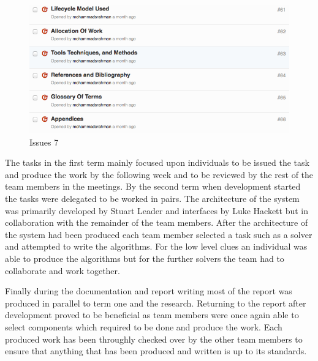 \begin{figure}[H]
  \centering
  \includegraphics[width=\linewidth]{images/issues7.png}
  \caption{Issues 7}
  \label{fig:issues7}
\end{figure}

The tasks in the first term mainly focused upon individuals to be issued the task and produce the work by the following week and to be reviewed by the rest of the team members in the meetings. By the second term when development started the tasks were delegated to be worked in pairs. The architecture of the system was primarily developed by Stuart Leader and interfaces by Luke Hackett but in collaboration with the remainder of the team members. After the architecture of the system had been produced each team member selected a task such as a solver and attempted to write the algorithms. For the low level clues an individual was able to produce the algorithms but for the further solvers the team had to collaborate and work together.

Finally during the documentation and report writing most of the report was produced in parallel to term one and the research. Returning to the report after development proved to be beneficial as team members were once again able to select components which required to be done and produce the work. Each produced work has been throughly checked over by the other team members to ensure that anything that has been produced and written is up to its standards.